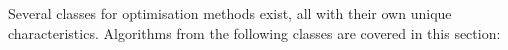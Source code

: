 Several classes for optimisation methods exist, all with their own unique characteristics. Algorithms from the following classes are covered in this section:
